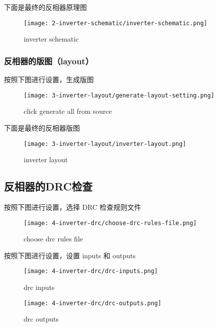 \documentclass{theme-2614084}
\begin{document}
下面是最终的反相器原理图

\begin{figure}[H]
  \centering\texttt{[image: 2-inverter-schematic/inverter-schematic.png]}
  \caption{inverter schematic}
\end{figure}

\subsubsection{反相器的版图（layout）}

按照下图进行设置，生成版图

\begin{figure}[H]
  \centering\texttt{[image: 3-inverter-layout/generate-layout-setting.png]}
  \caption{click generate all from source}
\end{figure}

下面是最终的反相器版图

\begin{figure}[H]
  \centering\texttt{[image: 3-inverter-layout/inverter-layout.png]}
  \caption{inverter layout}
\end{figure}

\subsection{反相器的DRC检查}

按照下图进行设置，选择 DRC 检查规则文件

\begin{figure}[H]
  \centering\texttt{[image: 4-inverter-drc/choose-drc-rules-file.png]}
  \caption{choose drc rules file}
\end{figure}

按照下图进行设置，设置 inputs 和 outputs

\begin{figure}[htbp]
  \centering\begin{minipage}[t]{0.48\textwidth}
      \centering\texttt{[image: 4-inverter-drc/drc-inputs.png]}
      \caption{drc inputs}
  \end{minipage}
  \centering\begin{minipage}[t]{0.48\textwidth}
      \centering\texttt{[image: 4-inverter-drc/drc-outputs.png]}
      \caption{drc outputs}
  \end{minipage}
\end{figure}
\end{document}
